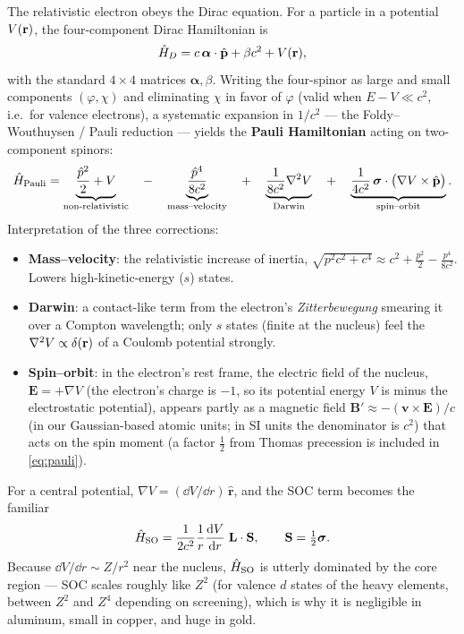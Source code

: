 The relativistic electron obeys the Dirac equation. For a particle in a
potential $V(\mathbf{r})$, the four-component Dirac Hamiltonian is
\begin{equation}
\hat{H}_D = c\, \bm\alpha \cdot \hat{\mathbf p} + \beta c^2 + V(\mathbf{r}),
\end{equation}
with the standard $4\times4$ matrices $\bm\alpha, \beta$. Writing the
four-spinor as large and small components $(\varphi, \chi)$ and eliminating
$\chi$ in favor of $\varphi$ (valid when $E - V \ll c^2$, i.e.\ for valence
electrons), a systematic expansion in $1/c^2$ --- the Foldy--Wouthuysen /
Pauli reduction --- yields the \textbf{Pauli Hamiltonian} acting on
two-component spinors:
\begin{equation}
\hat{H}_{\mathrm{Pauli}} =
\underbrace{\frac{\hat p^2}{2} + V}_{\text{non-relativistic}}
\quad-\quad \underbrace{\frac{\hat p^4}{8 c^2}}_{\text{mass--velocity}}
\quad+\quad \underbrace{\frac{1}{8 c^2} \nabla^2 V}_{\text{Darwin}}
\quad+\quad \underbrace{\frac{1}{4 c^2}\,
\bm\sigma \cdot \big(\nabla V \times \hat{\mathbf p}\big)}_{\text{spin--orbit}} .
\label{eq:pauli}
\end{equation}
Interpretation of the three corrections:
\begin{itemize}[leftmargin=2em]
\item \textbf{Mass--velocity}: the relativistic increase of inertia,
$\sqrt{p^2c^2 + c^4} \approx c^2 + \tfrac{p^2}{2} - \tfrac{p^4}{8c^2}$.
Lowers high-kinetic-energy ($s$) states.
\item \textbf{Darwin}: a contact-like term from the electron's
\emph{Zitterbewegung} smearing it over a Compton wavelength; only $s$ states
(finite at the nucleus) feel the $\nabla^2 V \propto \delta(\mathbf{r})$ of a
Coulomb potential strongly.
\item \textbf{Spin--orbit}: in the electron's rest frame, the electric field
of the nucleus, $\mathbf E = +\nabla V$ (the electron's charge is $-1$, so
its potential energy $V$ is minus the electrostatic potential), appears
partly as a magnetic field
$\mathbf B' \approx -(\mathbf v \times \mathbf E)/c$ (in our Gaussian-based
atomic units; in SI units the denominator is $c^2$) that acts on the spin
moment (a factor $\tfrac12$ from Thomas precession is included in
\eqref{eq:pauli}).
\end{itemize}
For a central potential, $\nabla V = (\dd V/\dd r)\, \hat{\mathbf r}$, and
the SOC term becomes the familiar
\begin{equation}
\hat{H}_{\mathrm{SO}} = \frac{1}{2c^2} \frac{1}{r} \frac{\mathrm{d} V}{\mathrm{d} r}\;
\mathbf{L}\cdot\mathbf{S},
\qquad \mathbf S = \tfrac12 \bm\sigma .
\label{eq:hso_central}
\end{equation}
Because $\dd V/\dd r \sim Z/r^2$ near the nucleus, $\hat{H}_{\mathrm{SO}}$ is
utterly dominated by the core region --- SOC scales roughly like $Z^2$
(for valence $d$ states of the heavy elements, between $Z^2$ and $Z^4$
depending on screening), which is why it is negligible in aluminum, small in
copper, and huge in gold.


